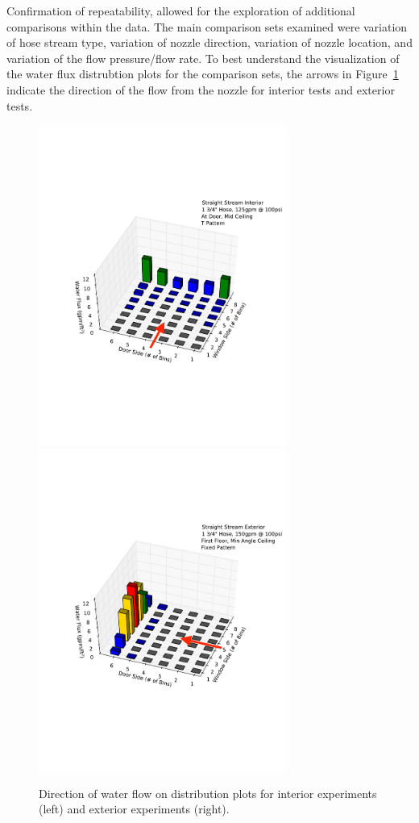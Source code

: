 \documentclass[12pt,oneside]{book}
\begin{document}
Confirmation of repeatability, allowed for the exploration of additional comparisons within the data. The main comparison sets examined were variation of hose stream type, variation of nozzle direction, variation of nozzle location, and variation of the flow pressure/flow rate. To best understand the visualization of the water flux distrubtion plots for the comparison sets, the arrows in Figure~\ref{fig:water_flow} indicate the direction of the flow from the nozzle for interior tests and exterior tests.

\begin{figure}[ht]
\includegraphics[width=3.2in]{Figures/Water_Distribution/Water_Flux_Interior}
\includegraphics[width=3.2in]{Figures/Water_Distribution/Water_Flux_Exterior}
\caption[Direction of Water Flow on Distribution Plots]{Direction of water flow on distribution plots for interior experiments (left) and exterior experiments (right).}
\label{fig:water_flow}
\end{figure}
\end{document}
